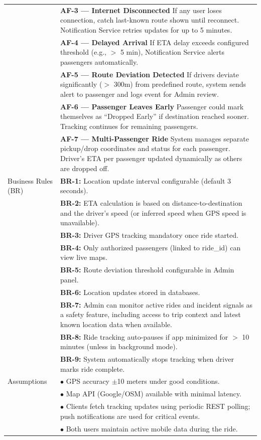 \begin{longtable}{|>{\raggedright\arraybackslash}p{4cm}|>{\raggedright\arraybackslash}p{11cm}|}
& \textbf{AF-3 — Internet Disconnected} \newline If any user loses connection, catch last-known route shown until reconnect. Notification Service retries updates for up to 5 minutes. \\
& \textbf{AF-4 — Delayed Arrival} \newline If ETA delay exceeds configured threshold (e.g., $>$ 5 min), Notification Service alerts passengers automatically. \\
& \textbf{AF-5 — Route Deviation Detected} \newline If drivers deviate significantly ($>$ 300m) from predefined route, system sends alert to passenger and logs event for Admin review. \\
& \textbf{AF-6 — Passenger Leaves Early} \newline Passenger could mark themselves as “Dropped Early” if destination reached sooner. Tracking continues for remaining passengers. \\
& \textbf{AF-7 — Multi-Passenger Ride} \newline System manages separate pickup/drop coordinates and status for each passenger. Driver’s ETA per passenger updated dynamically as others are dropped off. \\
\hline
Business Rules (BR) & \textbf{BR-1:} Location update interval configurable (default 3 seconds). \\
& \textbf{BR-2:} ETA calculation is based on distance-to-destination and the driver’s speed (or inferred speed when GPS speed is unavailable). \\
& \textbf{BR-3:} Driver GPS tracking mandatory once ride started. \\
& \textbf{BR-4:} Only authorized passengers (linked to ride\_id) can view live maps. \\
& \textbf{BR-5:} Route deviation threshold configurable in Admin panel. \\
& \textbf{BR-6:} Location updates stored in databases. \\
& \textbf{BR-7:} Admin can monitor active rides and incident signals as a safety feature, including access to trip context and latest known location data when available. \\
& \textbf{BR-8:} Ride tracking auto-pauses if app minimized for $>$ 10 minutes (unless in background mode). \\
& \textbf{BR-9:} System automatically stops tracking when driver marks ride complete. \\
\hline
Assumptions & $\bullet$ GPS accuracy $\pm$10 meters under good conditions. \\
& $\bullet$ Map API (Google/OSM) available with minimal latency. \\
& $\bullet$ Clients fetch tracking updates using periodic REST polling; push notifications are used for critical events. \\
& $\bullet$ Both users maintain active mobile data during the ride. \\
\hline
\end{longtable}

